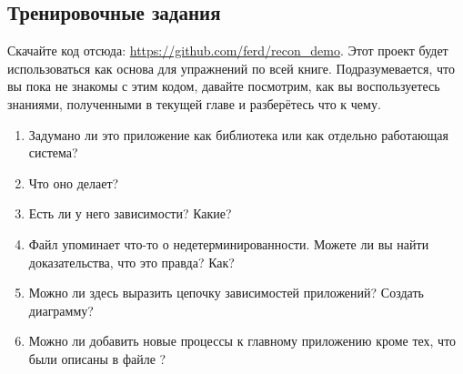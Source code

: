 \documentclass[11pt, oneside]{book}   	%
\newcommand{\HandsOnTitle}{Тренировочные задания}
\begin{document}
\subsection*{\HandsOnTitle{}}

Скачайте код отсюда: \href{https://github.com/ferd/recon\_demo}{https://github.com/ferd/recon\_demo}. Этот проект будет использоваться как основа для упражнений по всей книге. Подразумевается, что вы пока не знакомы с этим кодом, давайте посмотрим, как вы воспользуетесь знаниями, полученными в текущей главе и разберётесь что к чему.

\begin{enumerate}
	\item Задумано ли это приложение как библиотека или как отдельно работающая система?
	\item Что оно делает?
	\item Есть ли у него зависимости? Какие?
	\item Файл  упоминает что-то о недетерминированности. Можете ли вы найти доказательства, что это правда? Как?
	\item Можно ли здесь выразить цепочку зависимостей приложений? Создать диаграмму?
	\item Можно ли добавить новые процессы к главному приложению кроме тех, что были описаны в файле ?
\end{enumerate}
\end{document}
